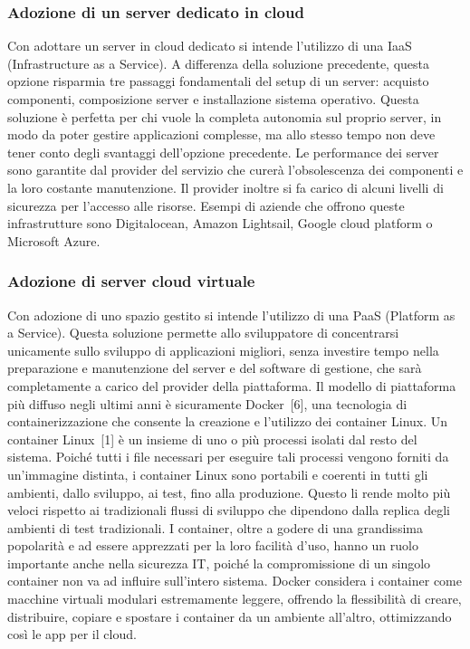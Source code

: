 \documentclass[12pt,a4paper]{article}
\begin{document}
\subsubsection{Adozione di un server dedicato in cloud}
Con adottare un server in cloud dedicato si intende l’utilizzo di una IaaS (Infrastructure as a Service). A differenza della soluzione precedente, questa opzione risparmia tre passaggi fondamentali del setup di un server: acquisto componenti, composizione server e installazione sistema operativo.
Questa soluzione è perfetta per chi vuole la completa autonomia sul proprio server, in modo da poter gestire applicazioni complesse, ma allo stesso tempo non deve tener conto degli svantaggi dell’opzione precedente. Le performance dei server sono garantite dal provider del servizio che curerà l’obsolescenza dei componenti e la loro costante manutenzione. Il provider inoltre si fa carico di alcuni livelli di sicurezza per l’accesso alle risorse. Esempi di aziende che offrono queste infrastrutture sono Digitalocean, Amazon Lightsail, Google cloud platform o Microsoft Azure.

\subsubsection{Adozione di server cloud virtuale}
Con adozione di uno spazio gestito si intende l’utilizzo di una PaaS (Platform as a Service). Questa soluzione permette allo sviluppatore di concentrarsi unicamente sullo sviluppo di applicazioni migliori, senza investire tempo nella preparazione e manutenzione del server e del software di gestione, che sarà completamente a carico del provider della piattaforma.
Il modello di piattaforma più diffuso negli ultimi anni è sicuramente Docker~[6], una tecnologia di containerizzazione che consente la creazione e l'utilizzo dei container Linux.
Un container Linux~[1] è un insieme di uno o più processi isolati dal resto del sistema. Poiché tutti i file necessari per eseguire tali processi vengono forniti da un'immagine distinta, i container Linux sono portabili e coerenti in tutti gli ambienti, dallo sviluppo, ai test, fino alla produzione. Questo li rende molto più veloci rispetto ai tradizionali flussi di sviluppo che dipendono dalla replica degli ambienti di test tradizionali. I container, oltre a godere di una grandissima popolarità e ad essere apprezzati per la loro facilità d'uso, hanno un ruolo importante anche nella sicurezza IT, poiché la compromissione di un singolo container non va ad influire sull’intero sistema.
Docker considera i container come macchine virtuali modulari estremamente leggere, offrendo la flessibilità di creare, distribuire, copiare e spostare i container da un ambiente all'altro, ottimizzando così le app per il cloud.
\end{document}
